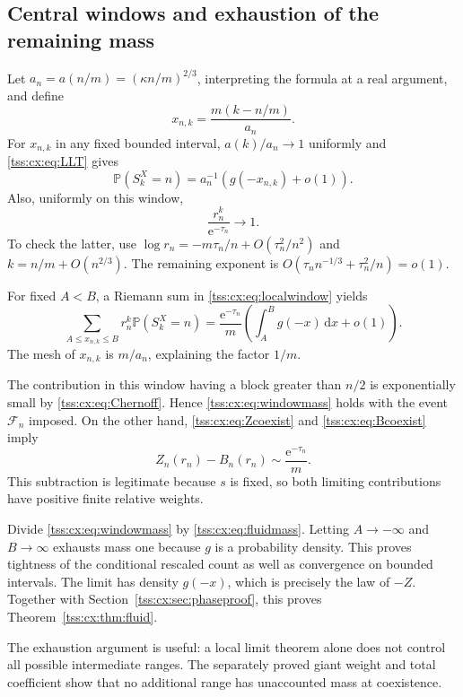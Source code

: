 \documentclass[11pt]{article}
\theoremstyle{remark}\newtheorem{remark}[theorem]{Remark}
\theoremstyle{definition}\newtheorem{definition}[theorem]{Definition}
\newcommand{\dd}{\mathrm d}
\newcommand{\e}{\mathrm e}
\newcommand{\Prob}{\mathbb P}
\newcommand{\Fev}{\mathcal F_n}
\begin{document}
\subsection{Central windows and exhaustion of the remaining mass}
Let $a_n=a(n/m)=(\kappa n/m)^{2/3}$, interpreting the formula at a
real argument, and define
\[
 x_{n,k}=\frac{m(k-n/m)}{a_n}.
\]
For $x_{n,k}$ in any fixed bounded interval,
$a(k)/a_n\to1$ uniformly and \eqref{tss:cx:eq:LLT} gives
\begin{equation}\label{tss:cx:eq:localwindow}
 \Prob(S_k^X=n)=a_n^{-1}(g(-x_{n,k})+o(1)).
\end{equation}
Also, uniformly on this window,
\begin{equation}\label{tss:cx:eq:weightwindow}
 \frac{r_n^k}{\e^{-\tau_n}}\longrightarrow1.
\end{equation}
To check the latter, use
$\log r_n=-m\tau_n/n+O(\tau_n^2/n^2)$ and
$k=n/m+O(n^{2/3})$. The remaining exponent is
$O(\tau_n n^{-1/3}+\tau_n^2/n)=o(1)$.

For fixed $A<B$, a Riemann sum in \eqref{tss:cx:eq:localwindow} yields
\begin{equation}\label{tss:cx:eq:windowmass}
 \sum_{A\le x_{n,k}\le B}r_n^k\Prob(S_k^X=n)
 =\frac{\e^{-\tau_n}}m
   \left(\int_A^B g(-x)\,\dd x+o(1)\right).
\end{equation}
The mesh of $x_{n,k}$ is $m/a_n$, explaining the factor $1/m$.

The contribution in this window having a block greater than $n/2$
is exponentially small by \eqref{tss:cx:eq:Chernoff}. Hence
\eqref{tss:cx:eq:windowmass} holds with the event $\Fev$ imposed.
On the other hand, \eqref{tss:cx:eq:Zcoexist} and \eqref{tss:cx:eq:Bcoexist} imply
\begin{equation}\label{tss:cx:eq:fluidmass}
 Z_n(r_n)-B_n(r_n)\sim\frac{\e^{-\tau_n}}m.
\end{equation}
This subtraction is legitimate because $s$ is fixed, so both
limiting contributions have positive finite relative weights.

Divide \eqref{tss:cx:eq:windowmass} by \eqref{tss:cx:eq:fluidmass}.
Letting $A\to-\infty$ and $B\to\infty$ exhausts mass one because
$g$ is a probability density. This proves tightness of the conditional
rescaled count as well as convergence on bounded intervals. The limit
has density $g(-x)$, which is precisely the law of $-Z$.
Together with Section~\ref{tss:cx:sec:phaseproof}, this proves
Theorem~\ref{tss:cx:thm:fluid}.

The exhaustion argument is useful: a local limit theorem alone does
not control all possible intermediate ranges. The separately proved
giant weight and total coefficient show that no additional range has
unaccounted mass at coexistence.
\end{document}
